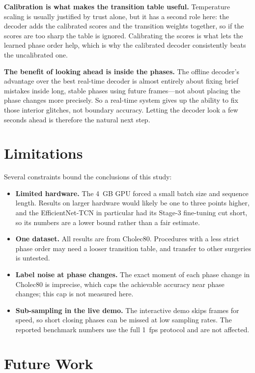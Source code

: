 \textbf{Calibration is what makes the transition table useful.} Temperature scaling is usually justified by trust alone, but it has a second role here: the decoder adds the calibrated scores and the transition weights together, so if the scores are too sharp the table is ignored. Calibrating the scores is what lets the learned phase order help, which is why the calibrated decoder consistently beats the uncalibrated one.

\textbf{The benefit of looking ahead is inside the phases.} The offline decoder's advantage over the best real-time decoder is almost entirely about fixing brief mistakes inside long, stable phases using future frames---not about placing the phase changes more precisely. So a real-time system gives up the ability to fix those interior glitches, not boundary accuracy. Letting the decoder look a few seconds ahead is therefore the natural next step.

\section{Limitations}

Several constraints bound the conclusions of this study:

\begin{itemize}
    \item \textbf{Limited hardware.} The 4~GB GPU forced a small batch size and sequence length. Results on larger hardware would likely be one to three points higher, and the EfficientNet-TCN in particular had its Stage-3 fine-tuning cut short, so its numbers are a lower bound rather than a fair estimate.
    \item \textbf{One dataset.} All results are from Cholec80. Procedures with a less strict phase order may need a looser transition table, and transfer to other surgeries is untested.
    \item \textbf{Label noise at phase changes.} The exact moment of each phase change in Cholec80 is imprecise, which caps the achievable accuracy near phase changes; this cap is not measured here.
    \item \textbf{Sub-sampling in the live demo.} The interactive demo skips frames for speed, so short closing phases can be missed at low sampling rates. The reported benchmark numbers use the full 1~fps protocol and are not affected.
\end{itemize}

\section{Future Work}

